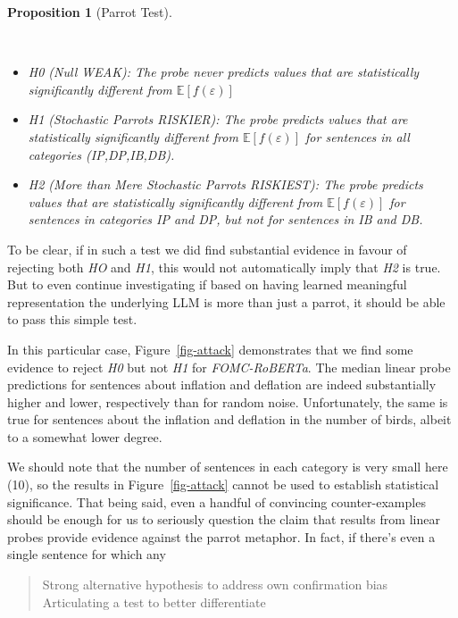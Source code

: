 \documentclass{article}
\theoremstyle{plain}
\newtheorem{proposition}[theorem]{Proposition}
\theoremstyle{definition}
\theoremstyle{remark}
\begin{document}
\begin{proposition}[Parrot
Test]\protect\hypertarget{prp-line}{}\label{prp-line}

~

\begin{itemize}
\tightlist
\item
  \emph{H0} (Null \emph{WEAK}): The probe never predicts values that are
  statistically significantly different from
  \(\mathbb{E}[f(\varepsilon)]\)
\item
  \emph{H1} (Stochastic Parrots \emph{RISKIER}): The probe predicts
  values that are statistically significantly different from
  \(\mathbb{E}[f(\varepsilon)]\) for sentences in all categories
  (IP,DP,IB,DB).
\item
  \emph{H2} (More than Mere Stochastic Parrots \emph{RISKIEST}): The
  probe predicts values that are statistically significantly different
  from \(\mathbb{E}[f(\varepsilon)]\) for sentences in categories IP and
  DP, but not for sentences in IB and DB.
\end{itemize}

\end{proposition}

To be clear, if in such a test we did find substantial evidence in
favour of rejecting both \emph{HO} and \emph{H1}, this would not
automatically imply that \emph{H2} is true. But to even continue
investigating if based on having learned meaningful representation the
underlying LLM is more than just a parrot, it should be able to pass
this simple test.

In this particular case, Figure~\ref{fig-attack} demonstrates that we
find some evidence to reject \emph{H0} but not \emph{H1} for
\emph{FOMC-RoBERTa}. The median linear probe predictions for sentences
about inflation and deflation are indeed substantially higher and lower,
respectively than for random noise. Unfortunately, the same is true for
sentences about the inflation and deflation in the number of birds,
albeit to a somewhat lower degree.

We should note that the number of sentences in each category is very
small here (10), so the results in Figure~\ref{fig-attack} cannot be
used to establish statistical significance. That being said, even a
handful of convincing counter-examples should be enough for us to
seriously question the claim that results from linear probes provide
evidence against the parrot metaphor. In fact, if there's even a single
sentence for which any

\begin{quote}
Strong alternative hypothesis to address own confirmation bias
Articulating a test to better differentiate
\end{quote}
\end{document}
